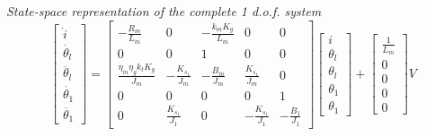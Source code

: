 \textit{State-space representation of the complete 1 d.o.f. system}
\begin{equation}
	\begin{bmatrix}
		\dot{i} \\
		\dot{\theta_l} \\
		\ddot{\theta_l} \\
		\dot{\theta_1} \\
		\ddot{\theta_1}
	\end{bmatrix}
	=
	\begin{bmatrix}
		-\frac{R_m}{L_m} & 0 & -\frac{k_m K_g}{L_m} & 0 & 0 \\
		0 & 0 &1 & 0 & 0 \\
		\frac{\eta_m \eta_g k_t K_g}{J_m} & -\frac{K_{s_1}}{J_m} & -\frac{B_m}{J_m} & \frac{K_{s_1}}{J_m} & 0 \\
		0 & 0 & 0 & 0 & 1 \\
		0 & \frac{K_{s_1}}{J_1} & 0 & -\frac{K_{s_1}}{J_1} & -\frac{B_1}{J_1}
	\end{bmatrix}
	\begin{bmatrix}
		i \\
		\theta_l \\
		\theta_l \\
		\theta_1 \\
		\theta_1
	\end{bmatrix}
	+
	\begin{bmatrix}
		\frac{1}{L_m} \\
		0 \\
		0 \\
		0 \\
		0
	\end{bmatrix}
	V
\end{equation}

